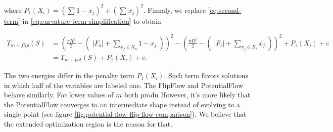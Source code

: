 where $P_1(X_i) = (\sum_{}{ 1-x_j})^2 + (\sum_{}{x_j})^2$. Finnaly, we  replace \eqref{eq:second-term} in \eqref{eq:curvature-term-simplification} to obtain

\begin{align}
T_{m-flip}(S) &= ( \frac{\pi R^2}{2} - (\; |F_o| + \sum_{ x_j \in X_o}{1-x_j} \; ) )^2 -(\frac{\pi R^2}{2} - (\; |F_i| + \sum_{x_j \in X_i}{x_j}\;))^2  + P_1(X_i) + c \nonumber \\
&= T_{m-pot}(S) + P_1(X_i) + c.
\end{align}

The two energies differ in the penalty term $P_1(X_i)$. Such term favors solutions in which half of the variables are labeled one. The FlipFlow and PotentialFlow behave similarly. For lower values of $m$ both produ However, it's more likely that the PotentialFlow converges to an intermediate shape instead of evolving to a single point (see figure \ref{fig:potential-flow-flip-flow-comparison}). We believe that the extended optimization region is the reason for that.

